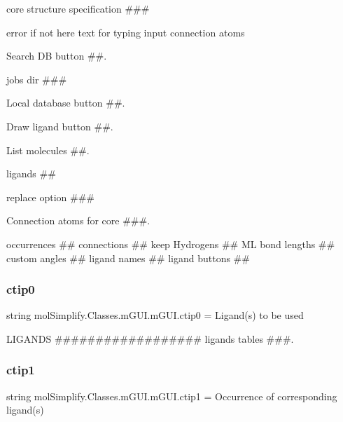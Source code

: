 core structure specification \#\#\# 

error if not here text for typing input connection atoms

Search DB button \#\#.

jobs dir \#\#\#

Local database button \#\#.

Draw ligand button \#\#.

List molecules \#\#.

ligands \#\#

replace option \#\#\#

Connection atoms for core \#\#\#.

occurrences \#\# connections \#\# keep Hydrogens \#\# ML bond lengths \#\# custom angles \#\# ligand names \#\# ligand buttons \#\# \mbox{\label{classmolSimplify_1_1Classes_1_1mGUI_1_1mGUI_aa56dd2adc764c7869b8e2fc67a5498b0}} 
\subsubsection{\texorpdfstring{ctip0}{ctip0}}
{\footnotesize\ttfamily string mol\+Simplify.\+Classes.\+m\+G\+U\+I.\+m\+G\+U\+I.\+ctip0 = \textquotesingle{}Ligand(s) to be used\textquotesingle{}\hspace{0.3cm}{\ttfamily [static]}}



L\+I\+G\+A\+N\+DS \#\#\#\#\#\#\#\#\#\#\#\#\#\#\#\#\#\# ligands tables \#\#\#. 

\mbox{\label{classmolSimplify_1_1Classes_1_1mGUI_1_1mGUI_ae1052cd0c450b0885b619d6c44b11202}} 
\subsubsection{\texorpdfstring{ctip1}{ctip1}}
{\footnotesize\ttfamily string mol\+Simplify.\+Classes.\+m\+G\+U\+I.\+m\+G\+U\+I.\+ctip1 = \textquotesingle{}Occurrence of corresponding ligand(s)\textquotesingle{}\hspace{0.3cm}{\ttfamily [static]}}

